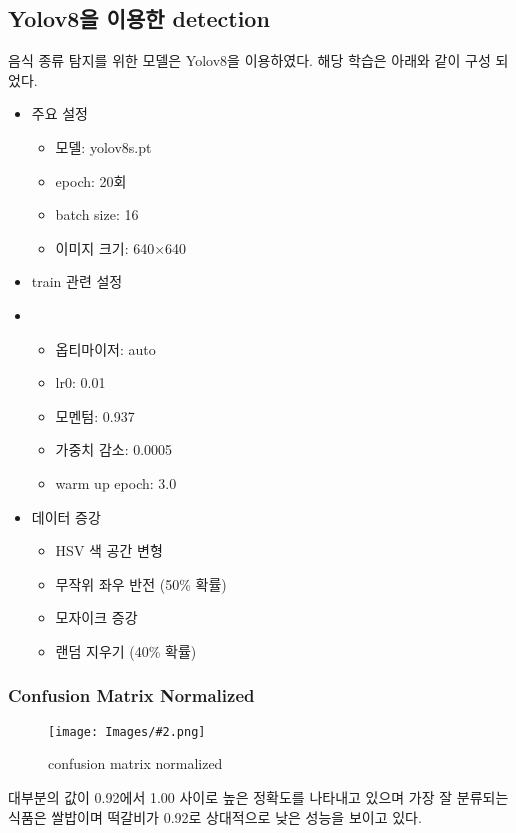 \documentclass[10pt, a4paper]{article}
\newcommand{\img}[3][0.8]{
    \begin{figure}[tbh!]
    \begin{center}
    \texttt{[image: Images/\#2.png]}
    \end{center}
    \caption{#3}
    \label{fig:#3}
    \end{figure}}
\theoremstyle{definition}
\begin{document}
    \subsection{Yolov8을 이용한 detection}\label{subsec:음식 종류 인식}
    음식 종류 탐지를 위한 모델은 Yolov8을 이용하였다. 해당 학습은 아래와 같이 구성 되었다.
    \begin{itemize}
        \item 주요 설정
        \begin{itemize}
            \item 모델: yolov8s.pt
            \item epoch: 20회
            \item batch size: 16
            \item 이미지 크기: 640×640
        \end{itemize}
        \item train 관련 설정
        \item []
        \begin{itemize}
            \item 옵티마이저: auto
            \item lr0: 0.01
            \item 모멘텀: 0.937
            \item 가중치 감소: 0.0005
            \item warm up epoch: 3.0
        \end{itemize}
        \item 데이터 증강
        \begin{itemize}
            \item HSV 색 공간 변형
            \item 무작위 좌우 반전 (50\% 확률)
            \item 모자이크 증강
            \item 랜덤 지우기 (40\% 확률)
        \end{itemize}
    \end{itemize}

    \subsubsection{Confusion Matrix Normalized}\label{subsubsec:Confusion Matrix Normalized}
    \img[1.0]{confusion_nomalized_matrix}{confusion matrix normalized}
    대부분의 값이 0.92에서 1.00 사이로 높은 정확도를 나타내고 있으며 가장 잘 분류되는 식품은 쌀밥이며 떡갈비가 0.92로 상대적으로 낮은 성능을 보이고 있다.
\end{document}
